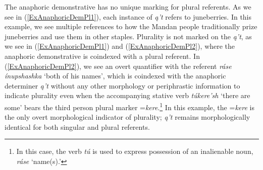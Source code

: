 The anaphoric demonstrative has no unique marking for plural referents. As we see in (\ref{ExAnaphoricDemPl1}), each instance of \textit{ą't} refers to juneberries. In this example, we see multiple references to how the Mandan people traditionally prize juneberries and use them in other staples. Plurality is not marked on the \textit{ą't}, as we see in (\ref{ExAnaphoricDemPl1}) and (\ref{ExAnaphoricDemPl2}), where the anaphoric demonstrative is coindexed with a plural referent. In (\ref{ExAnaphoricDemPl2}), we see an overt quantifier with the referent \textit{ráse ínupshashka} `both of his names', which is coindexed with the anaphoric determiner \textit{ą't} without any other morphology or periphrastic information to indicate plurality even when the accompanying stative verb \textit{túkere'sh} `there are some' bears the third person plural marker =\textit{kere}.\footnote{In this case, the verb \textit{tú} is used to express possession of an inalienable noun, \textit{ráse} `name(s).'} In this example, the =\textit{kere} is the only overt morphological indicator of plurality; \textit{ą't} remains morphologically identical for both singular and plural referents.


